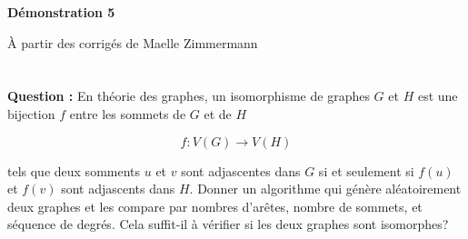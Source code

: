 \documentclass[11pt]{article} %
\newenvironment{question}[1][\unskip]{%
	\par
	\noindent
	\textbf{Question #1:}
	\noindent}
{\medskip}
\begin{document}
		
	
	\noindent \hrulefill
	\centerline{\bfseries Démonstration 5}
	\centerline{À partir des corrigés de Maelle Zimmermann}	
	\noindent \hrulefill
	
	\vspace{1cm}
	
	\section{}
	\begin{question}
		En théorie des graphes, un isomorphisme de graphes $G$ et $H$ est une bijection $f$ entre les sommets de $G$ et de $H$
		
		$$f: V(G) \rightarrow V(H)$$
		
		tels que deux somments $u$ et $v$ sont adjascentes dans $G$ si et seulement si $f(u)$ et $f(v)$ sont adjascents dans $H$. Donner un algorithme qui génère aléatoirement deux graphes et les compare par nombres d'arêtes, nombre de sommets, et séquence de degrés. Cela suffit-il à vérifier si les deux graphes sont isomorphes?
	\end{question}
\end{document}
